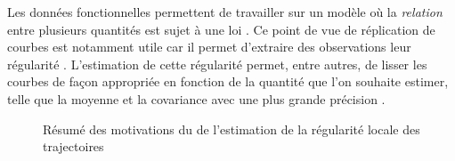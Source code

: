 
Les données fonctionnelles permettent de travailler sur un modèle où la \emph{relation} entre plusieurs quantités est sujet à une loi . Ce point de vue de réplication de courbes est notamment utile car il permet d'extraire des observations leur régularité . L'estimation de cette régularité permet, entre autres, de lisser les courbes de façon appropriée en fonction de la quantité que l'on souhaite estimer, telle que la moyenne et la covariance avec une plus grande précision .

\noindent\begin{figure}[H]
    \centering
    \caption{Résumé des motivations du de l'estimation de la régularité locale des trajectoires}
    \label{fig:sketch_resume_informel}
\end{figure}
